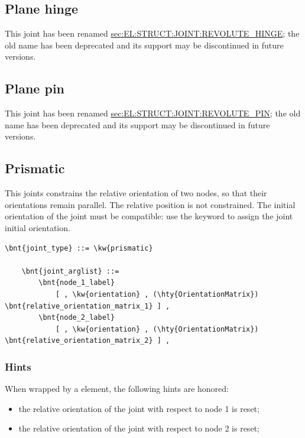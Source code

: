 \subsection{Plane hinge}
This joint has been renamed
\hyperref{\kw{revolute hinge}}{\kw{revolute hinge} (see Section~}{)}{sec:EL:STRUCT:JOINT:REVOLUTE_HINGE};
the old name has been deprecated and its support may be discontinued
in future versions.

\subsection{Plane pin}
This joint has been renamed
\hyperref{\kw{revolute pin}}{\kw{revolute pin} (see Section~}{)}{sec:EL:STRUCT:JOINT:REVOLUTE_PIN};
the old name has been deprecated and its support may be discontinued
in future versions.

\subsection{Prismatic}
This joints constrains the relative orientation of two nodes, so that
their orientations remain parallel.
The relative position is not constrained.
The initial orientation of the joint must be
compatible: use the  keyword to assign 
the joint initial orientation.
\begin{Verbatim}[commandchars=\\\{\}]
    \bnt{joint_type} ::= \kw{prismatic}

    \bnt{joint_arglist} ::= 
        \bnt{node_1_label}
            [ , \kw{orientation} , (\hty{OrientationMatrix}) \bnt{relative_orientation_matrix_1} ] ,
        \bnt{node_2_label}
            [ , \kw{orientation} , (\hty{OrientationMatrix}) \bnt{relative_orientation_matrix_2} ] ,
\end{Verbatim}

\subsubsection{Hints}
When wrapped by a  element, the following hints are honored:
\begin{itemize}
\item {} the relative orientation of the joint
with respect to node 1 is reset;
\item {} the relative orientation of the joint
with respect to node 2 is reset;
\end{itemize}

